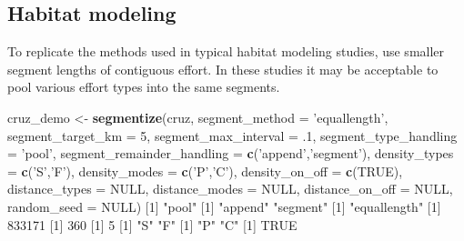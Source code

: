 \documentclass[
]{book}
\newenvironment{Shaded}{\begin{snugshade}}{\end{snugshade}}
\newcommand{\DataTypeTok}[1]{\textcolor[rgb]{0.13,0.29,0.53}{#1}}
\newcommand{\DecValTok}[1]{\textcolor[rgb]{0.00,0.00,0.81}{#1}}
\newcommand{\FloatTok}[1]{\textcolor[rgb]{0.00,0.00,0.81}{#1}}
\newcommand{\KeywordTok}[1]{\textcolor[rgb]{0.13,0.29,0.53}{\textbf{#1}}}
\newcommand{\NormalTok}[1]{#1}
\newcommand{\OtherTok}[1]{\textcolor[rgb]{0.56,0.35,0.01}{#1}}
\newcommand{\StringTok}[1]{\textcolor[rgb]{0.31,0.60,0.02}{#1}}
\begin{document}
\hypertarget{habitat-modeling}{%
\subsection*{Habitat modeling}\label{habitat-modeling}}

To replicate the methods used in typical habitat modeling studies, use smaller segment lengths of contiguous effort. In these studies it may be acceptable to pool various effort types into the same segments.

\begin{Shaded}
\begin{Highlighting}[]
\NormalTok{cruz_demo <-}\StringTok{ }\KeywordTok{segmentize}\NormalTok{(cruz,}
                        \DataTypeTok{segment_method =} \StringTok{'equallength'}\NormalTok{,}
                        \DataTypeTok{segment_target_km =} \DecValTok{5}\NormalTok{,}
                        \DataTypeTok{segment_max_interval =} \FloatTok{.1}\NormalTok{,}
                        \DataTypeTok{segment_type_handling =} \StringTok{'pool'}\NormalTok{,}
                        \DataTypeTok{segment_remainder_handling =} \KeywordTok{c}\NormalTok{(}\StringTok{'append'}\NormalTok{,}\StringTok{'segment'}\NormalTok{),}
                        \DataTypeTok{density_types =} \KeywordTok{c}\NormalTok{(}\StringTok{'S'}\NormalTok{,}\StringTok{'F'}\NormalTok{),}
                        \DataTypeTok{density_modes =} \KeywordTok{c}\NormalTok{(}\StringTok{'P'}\NormalTok{,}\StringTok{'C'}\NormalTok{),}
                        \DataTypeTok{density_on_off =} \KeywordTok{c}\NormalTok{(}\OtherTok{TRUE}\NormalTok{),}
                        \DataTypeTok{distance_types =} \OtherTok{NULL}\NormalTok{,}
                        \DataTypeTok{distance_modes =} \OtherTok{NULL}\NormalTok{,}
                        \DataTypeTok{distance_on_off =} \OtherTok{NULL}\NormalTok{,}
                        \DataTypeTok{random_seed =} \OtherTok{NULL}\NormalTok{)}
\NormalTok{[}\DecValTok{1}\NormalTok{] }\StringTok{"pool"}
\NormalTok{[}\DecValTok{1}\NormalTok{] }\StringTok{"append"}  \StringTok{"segment"}
\NormalTok{[}\DecValTok{1}\NormalTok{] }\StringTok{"equallength"}
\NormalTok{[}\DecValTok{1}\NormalTok{] }\DecValTok{833171}
\NormalTok{[}\DecValTok{1}\NormalTok{] }\DecValTok{360}
\NormalTok{[}\DecValTok{1}\NormalTok{] }\DecValTok{5}
\NormalTok{[}\DecValTok{1}\NormalTok{] }\StringTok{"S"} \StringTok{"F"}
\NormalTok{[}\DecValTok{1}\NormalTok{] }\StringTok{"P"} \StringTok{"C"}
\NormalTok{[}\DecValTok{1}\NormalTok{] }\OtherTok{TRUE}

\end{Highlighting}
\end{Shaded}
\end{document}
